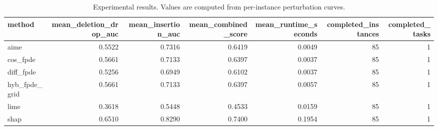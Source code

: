 \begin{table}[t]
\caption{Experimental results. Values are computed from per-instance perturbation curves.}
\label{tab:main_results_computed}
\centering
\begin{tabular}{lrrrrrr}
\toprule
method & mean\_deletion\_drop\_auc & mean\_insertion\_auc & mean\_combined\_score & mean\_runtime\_seconds & completed\_instances & completed\_tasks \\
\midrule
aime & 0.5522 & 0.7316 & 0.6419 & 0.0049 & 85 & 1 \\
cos\_fpde & 0.5661 & 0.7133 & 0.6397 & 0.0037 & 85 & 1 \\
diff\_fpde & 0.5256 & 0.6949 & 0.6102 & 0.0037 & 85 & 1 \\
hyb\_fpde\_grid & 0.5661 & 0.7133 & 0.6397 & 0.0057 & 85 & 1 \\
lime & 0.3618 & 0.5448 & 0.4533 & 0.0159 & 85 & 1 \\
shap & 0.6510 & 0.8290 & 0.7400 & 0.1954 & 85 & 1 \\
\bottomrule
\end{tabular}

\end{table}
